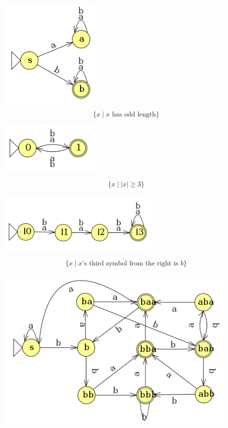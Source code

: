 \documentclass[letterpaper, 12pt]{math}
\begin{document}
\begin{enumerate}
\begin{enumerate}
    \begin{center}
      \includegraphics[width=5cm]{assets/hw_3_5.png}
    \end{center}
    \[ \{x\mid x\text{ has odd length}\} \]
    \begin{center}
      \includegraphics[width=5cm]{assets/hw_3_6.png}
    \end{center}
    \[ \{x\mid|x|\geq3\} \]
    \begin{center}
      \includegraphics[width=8cm]{assets/hw_3_7.png}
    \end{center}
    \[ \{x\mid x\text{'s third symbol from the right is } b\} \]
    \begin{center}
      \includegraphics[width=12cm]{assets/hw_3_8.png}

\end{center}
\end{enumerate}
\end{enumerate}
\end{document}
